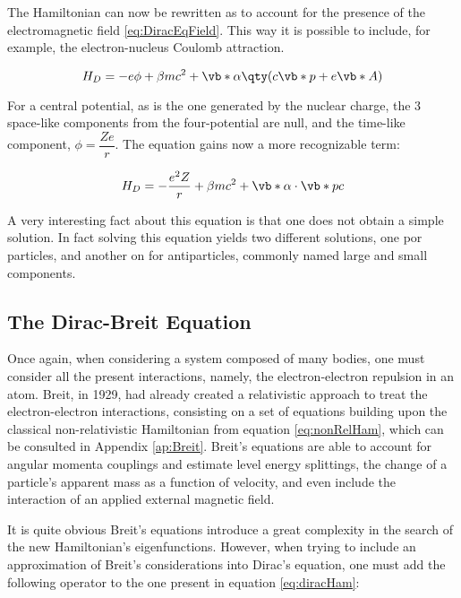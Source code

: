 The Hamiltonian can now be rewritten as to account for the presence of the electromagnetic field \eqref{eq:DiracEqField}. This way it is possible to include, for example, the electron-nucleus Coulomb attraction.

\begin{equation}
    H_D=-e\phi + \beta m c^2 + \vb*{\alpha}\qty(c\vb*{p}+e\vb*{A})
    \label{eq:DiracEqField}
\end{equation}

For a central potential, as is the one generated by the nuclear charge, the 3 space-like components from the four-potential are null, and the time-like component, $\phi=\dfrac{Z e}{r}$. The equation gains now a more recognizable term:

\begin{equation}
    H_D=-\frac{e^2 Z}{r} + \beta m c^2 + \vb*{\alpha}\cdot\vb*{p}c
    \label{eq:diracHam}
\end{equation}

A very interesting fact about this equation is that one does not obtain a simple solution.
In fact solving this equation yields two different solutions, one por particles, and another on for antiparticles, commonly named large and small components. 

\subsection{The Dirac-Breit Equation}

Once again, when considering a system composed of many bodies, one must consider all the present interactions, namely, the electron-electron repulsion in an atom.
 Breit, in 1929, had already created a relativistic approach to treat the electron-electron interactions, consisting on a set of equations building upon the classical non-relativistic Hamiltonian from equation \eqref{eq:nonRelHam}, which can be consulted in Appendix \ref{ap:Breit}.
  Breit's equations are able to account for angular momenta couplings and estimate level energy splittings, the change of a particle's apparent mass as a function of velocity, and even include the interaction of an applied external magnetic field.\cite{Bethe1977}

  It is quite obvious Breit's equations introduce a great complexity in the search of the new Hamiltonian's eigenfunctions. However, when trying to include an approximation of Breit's considerations into Dirac's equation, one must add the following operator to the one present in equation \eqref{eq:diracHam}:

